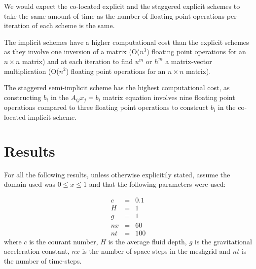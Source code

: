 \documentclass[a4paper,12pt, notitlepage]{article}
\begin{document}
We would expect the co-located explicit and the staggered explicit schemes to take the same amount of time as the number of floating point operations per iteration of each scheme is the same. 

The implicit schemes have a higher computational cost than the explicit schemes as they involve one inversion of a matrix (O($n^{3}$) floating point operations for an $n \times n$ matrix) and at each iteration to find $u^{m}$ or $h^{m}$ a matrix-vector multiplication (O($n^{2}$) floating point operations for an $n \times n$ matrix). 

The staggered semi-implicit scheme has the highest computational cost, as constructing $b_{i}$ in the $A_{ij}x_{j} = b_{i}$ matrix equation involves nine floating point operations compared to three floating point operations to construct $b_{i}$ in the co-located implicit scheme.

\section{Results}\label{results section}
For all the following results, unless otherwise explicitily stated, assume the domain used was $0 \leq x \leq 1$ and that the following parameters were used:

\begin{eqnarray}
c & = & 0.1\\
H & = & 1\\
g & = & 1\\
nx & = & 60\\
nt & = & 100
\end{eqnarray}
where $c$ is the courant number, $H$ is the average fluid depth, $g$ is the gravitational acceleration constant, $nx$ is the number of space-steps in the meshgrid and $nt$ is the number of time-steps.
\end{document}
